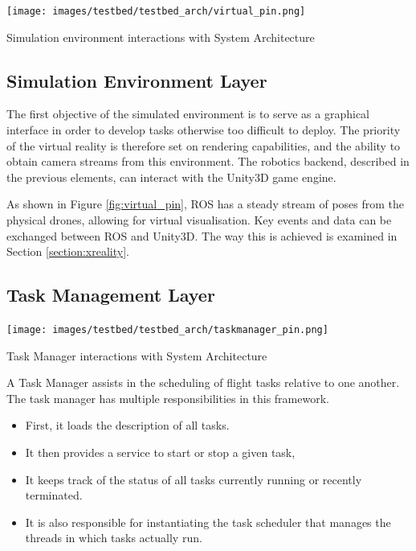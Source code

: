 \begin{marginfigure}%
  \texttt{[image: images/testbed/testbed\_arch/virtual\_pin.png]}
  \caption{Simulation environment interactions with System Architecture}
  \label{fig:virtual_pin}
\end{marginfigure}

\subsection{Simulation Environment Layer}

The first objective of the simulated environment is to serve as a graphical interface in order to develop tasks otherwise too difficult to deploy. The priority of the virtual reality is therefore set on rendering capabilities, and the ability to obtain camera streams from this environment. The robotics backend, described in the previous elements, can interact with the Unity3D game engine. 

As shown in Figure \ref{fig:virtual_pin}, ROS has a steady stream of poses from the physical drones, allowing for virtual visualisation. Key events and data can be exchanged between ROS and Unity3D. The way this is achieved is examined in Section \ref{section:xreality}.

\subsection{Task Management Layer}

\begin{marginfigure}%
  \texttt{[image: images/testbed/testbed\_arch/taskmanager\_pin.png]}
  \caption{Task Manager interactions with System Architecture}
\end{marginfigure}

A Task Manager assists in the scheduling of flight tasks relative to one another. The task manager has multiple responsibilities in this framework. 
\begin{itemize}
\item First, it loads the description of all
tasks. 
\item It then provides a service to start or stop a given task, 
\item It keeps track of the status of all tasks currently running or recently terminated. 
\item It is also responsible for instantiating the task scheduler that manages the threads in which tasks actually run.
\end{itemize}

